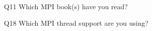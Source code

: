 \begin{description}%
\item{Q11} Which MPI book(s) have you read?%
\item{Q18} Which MPI thread support are you using?%
\end{description}%
